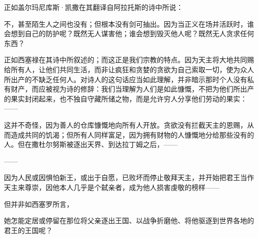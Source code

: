 \par

正如盖尔玛尼库斯·凯撒在其翻译自阿拉托斯的诗中所说：\par

\par

不，甚至陌生人之间也没有；但根本没有剑可抽出。因为当正义在场并活跃时，谁会想到自己的防护呢？既然无人谋害他；谁会想到毁灭他人呢？既然无人贪求任何东西？\par

\par

正如西塞禄在其诗中所叙述的；而这正是我们宗教的特点。因为天主将大地共同赐给所有人，让他们共同生活，而非让疯狂和贪婪的贪欲为自己索取一切，使为众人所出产的不缺乏任何人。对诗人的这句话应当如此理解，并非暗示那时个人没有私有财产，而应被视为诗的修辞：我们当理解为人们是如此慷慨，不把为他们所出产的果实封闭起来，也不独自守藏所储之物，而是允许穷人分享他们劳动的果实：——\par

\par

这并不奇怪，因为善人的仓库慷慨地向所有人开放。贪欲没有拦截天主的恩赐，从而造成共同的饥渴；但所有人同样富足，因为拥有财物的人慷慨地分给那些没有的人。但在撒杜尔努斯被逐出天界、到达拉丁姆之后，——\par

——\par

因为人民或因惧怕新王，或出于自愿，已败坏而停止敬拜天主，并开始把君王当作天主来尊崇，因他本人几乎是个弑亲者，成为他人损害虔敬的榜样——\par

\par

但并非如西塞罗所言，\par

\par

她怎能定居或停留在那位将父亲逐出王国、以战争折磨他、将他驱逐到世界各地的君王的王国呢？\par

\par

